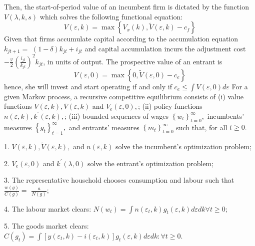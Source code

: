 \documentclass[]{article}
\begin{document}
Then, the start-of-period value of an incumbent firm is dictated by the function \( V(\lambda, k, s) \) which solves the following functional equation:
\[ V(\varepsilon, k)=\max \left\{V_{x}(k), \tilde{V}(\varepsilon, k)-c_{f}\right\} \] Given that firms accumulate capital according to the accumulation equation \( k_{j t+1}= \) \( (1-\delta) k_{j t}+i_{j t} \) and capital accumulation incurs the adjustment cost \( -\frac{\varphi}{2}\left(\frac{i_{jt} }{k_{j t}}\right)^{2} k_{j t} \), in units of output. The prospective value of an entrant is \[ V(\varepsilon, 0)=\max \left\{0, \tilde{V}(\varepsilon, 0)-c_{e}\right\} \] hence, she will invest and start operating if and only if \( c_{e} \leq \int V(\varepsilon, 0) d \varepsilon \)
For a given Markov process, a recursive competitive equilibrium consists of
(i) value functions \( V(\varepsilon, k), \bar{V}(\varepsilon, k) \) and \( V_{e}(\varepsilon, 0), \);
(ii) policy functions \( n(\varepsilon, k), k^{\prime}(\varepsilon, k), \);
(iii) bounded sequences of wages \( \left\{w_{t}\right\}_{t=0}^{\infty}, \) incumbents' measures \( \left\{g_{t}\right\}_{t=1}^{\infty}, \) and entrants' measures \( \left\{m_{t}\right\}_{t=0}^{\infty} \) such that, for all \( t \geq 0 \).

1. \( V(\varepsilon, k), \tilde{V}(\varepsilon, k), \) and \( n(\varepsilon, k) \) solve the incumbent's optimization problem;

2. \( V_{e}(\varepsilon, 0) \) and \( k^{\prime}(\lambda, 0) \) solve the entrant's optimization problem;

3. The representative houschold chooses consumption and labour such that \( \frac{w(g)}{C(g)}= \) \( \frac{a}{N(g)} \);

4. The labour market clears: \( N\left(w_{t}\right)=\int n\left(\varepsilon_{t}, k\right) g_{t}(\varepsilon, k) d \varepsilon d k \forall t \geq 0 \);

5. The goods market clears: \( C\left(g_{t}\right)=\int\left[y\left(\varepsilon_{t}, k\right)-i\left(\varepsilon_{t}, k\right)\right] g_{t}(\varepsilon, k) d \varepsilon d k: \forall t \geq 0 \).
\end{document}
